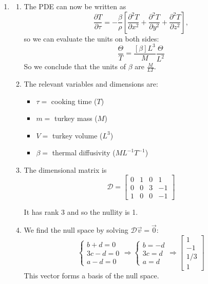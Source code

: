 \begin{enumerate}

\item 
\begin{enumerate}
	\item The PDE can now be written as
	\[
		\frac{\partial T}{\partial \tau} = -\frac{\beta}{\rho} \left[ \frac{\partial^2 T}{\partial x^2} + \frac{\partial^2 T}{\partial y^2} + \frac{\partial^2 T}{\partial z^2} \right],
	\]
	so we can evaluate the units on both sides:
	\[
	\frac{\Theta}{T} = \frac{[\beta]L^3}{M} \frac{\Theta}{L^2}
	\]
	So we conclude that the units of $\beta$ are $\frac{M}{LT}$.
	
	\item The relevant variables and dimensions are:
	\begin{itemize}
		\item $\tau = $ cooking time ($T$)
		\item $m = $ turkey mass ($M$)
		\item $V = $ turkey volume ($L^3$)
		\item $\beta = $ thermal diffusivity ($M L^{-1} T^{-1}$)
	\end{itemize}


\item The dimensional matrix is
\[ \mathcal{D} = \begin{bmatrix}
 0	& 1	& 0	& 1	 \\
 0	& 0	& 3	& -1 \\
 1	& 0	& 0	& -1
 \end{bmatrix}
\]

It has rank 3 and so the nullity is 1.

\item We find the null space by solving $\mathcal{D} \vec{v} = \vec{0}$:
\[
\begin{cases}
b+ d = 0\\
3c - d = 0 \\
a - d = 0
\end{cases}
\Rightarrow
\begin{cases}
b = -d  \\
3c = d \\
a = d
\end{cases}
\Rightarrow
\begin{bmatrix}
	1 \\ -1 \\ 1/3 \\ 1
\end{bmatrix}
\]
This vector forms a basis of the null space.


\end{enumerate}
\end{enumerate}
